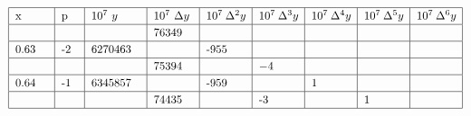 \begin{enumerate}
\begin{align*}
\renewcommand*{\arraystretch}{1.2}
\begin{tabular}{|p{1cm}| p{.5cm}|p{1.5cm}|p{1.2cm} |p{1.2cm}|p{1.2cm}|p{1.2cm}|p{1.2cm}|p{1.2cm}|}
\hline
x&p&$10^7\ y$&$10^7\ \Delta y$&$10^7\ \Delta^2 y$&$10^7\ \Delta^3 y$&$10^7\ \Delta^4 y$&$10^7\ \Delta^5 y$&$10^7\ \Delta^6 y$\\
\hline
 & & &76349& & & & &\\
 \hline 
 0.63&-2&6270463& &-955& & & &\\
 \hline
  & & &75394& &$-4$& & &  \\
  \hline
  0.64&-1&6345857& &-959& &1& & \\
  \hline
   & & &74435& &-3& &1& \\
   \hline
\end{tabular}
\end{align*}	

	
	
	
	
	
	
	
	
	
	
	
	
	
	
	
	
	
	
	
	
	
	
	
\end{enumerate}
